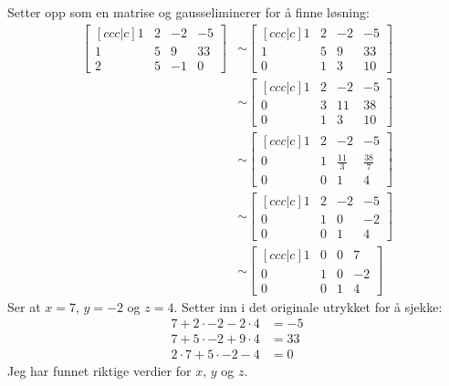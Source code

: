\documentclass[11pt, a4paper, norsk]{article}
\begin{document}
        Setter opp som en matrise og gausseliminerer for å finne løsning:
        \begin{align*}
            \begin{bmatrix}[ccc|c]
                1 & 2 & -2 & -5 \\
                1 & 5 & 9 & 33 \\
                2 & 5 & -1 & 0
            \end{bmatrix} &\sim \begin{bmatrix}[ccc|c]
            1 & 2 & -2 & -5 \\
            1 & 5 & 9 & 33 \\
            0 & 1 & 3 & 10
            \end{bmatrix}
            \\
            &\sim \begin{bmatrix}[ccc|c]
                1 & 2 & -2 & -5 \\
                0 & 3 & 11 & 38 \\
                0 & 1 & 3 & 10
            \end{bmatrix}
            \\
            &\sim \begin{bmatrix}[ccc|c]
                1 & 2 & -2 & -5 \\
                0 & 1 & \frac{11}{3} & \frac{38}{7} \\
                0 & 0 & 1 & 4
            \end{bmatrix}
            \\
            &\sim \begin{bmatrix}[ccc|c]
                1 & 2 & -2 & -5 \\
                0 & 1 & 0 & -2 \\
                0 & 0 & 1 & 4
            \end{bmatrix}
            \\
            &\sim \begin{bmatrix}[ccc|c]
                1 & 0 & 0 & 7 \\
                0 & 1 & 0 & -2 \\
                0 & 0 & 1 & 4
            \end{bmatrix}
        \end{align*}
        Ser at $x = 7$, $y = -2$ og $z = 4$. Setter inn i det originale utrykket for å sjekke:
        \begin{align*}
            7 + 2 \cdot -2 - 2\cdot 4 &= -5 \\
            7 + 5 \cdot -2 + 9 \cdot 4 &= 33 \\
            2 \cdot 7 + 5 \cdot -2 - 4 &= 0
        \end{align*}
        Jeg har funnet riktige verdier for $x$, $y$ og $z$.
\end{document}
